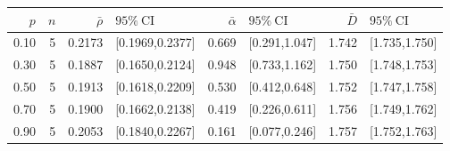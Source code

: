 \begin{tabular}{r r r l r l r l}%
\hline%
$p$&$n$&$\bar\rho$&$95\%\ \mathrm{CI}$&$\bar\alpha$&$95\%\ \mathrm{CI}$&$\bar D$&$95\%\ \mathrm{CI}$\\%
\hline%
0.10&5&0.2173&[0.1969,0.2377]&0.669&[0.291,1.047]&1.742&[1.735,1.750]\\%
0.30&5&0.1887&[0.1650,0.2124]&0.948&[0.733,1.162]&1.750&[1.748,1.753]\\%
0.50&5&0.1913&[0.1618,0.2209]&0.530&[0.412,0.648]&1.752&[1.747,1.758]\\%
0.70&5&0.1900&[0.1662,0.2138]&0.419&[0.226,0.611]&1.756&[1.749,1.762]\\%
0.90&5&0.2053&[0.1840,0.2267]&0.161&[0.077,0.246]&1.757&[1.752,1.763]\\%
\hline%
\end{tabular}
